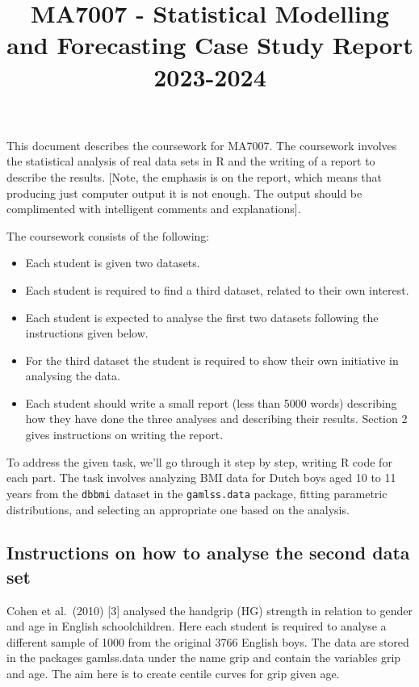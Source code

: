 \documentclass[
]{article}
\title{MA7007 - Statistical Modelling and Forecasting Case Study Report
2023-2024}
\author{}
\date{\vspace{-2.5em}}
\begin{document}
\maketitle

This document describes the coursework for MA7007. The coursework
involves the statistical analysis of real data sets in R and the writing
of a report to describe the results. {[}Note, the emphasis is on the
report, which means that producing just computer output it is not
enough. The output should be complimented with intelligent comments and
explanations{]}.

The coursework consists of the following:

\begin{itemize}
\item
  Each student is given two datasets.
\item
  Each student is required to find a third dataset, related to their own
  interest.
\item
  Each student is expected to analyse the first two datasets following
  the instructions given below.
\item
  For the third dataset the student is required to show their own
  initiative in analysing the data.
\item
  Each student should write a small report (less than 5000 words)
  describing how they have done the three analyses and describing their
  results. Section 2 gives instructions on writing the report.
\end{itemize}

To address the given task, we'll go through it step by step, writing R
code for each part. The task involves analyzing BMI data for Dutch boys
aged 10 to 11 years from the \texttt{dbbmi} dataset in the
\texttt{gamlss.data} package, fitting parametric distributions, and
selecting an appropriate one based on the analysis.

\hypertarget{instructions-on-how-to-analyse-the-second-data-set}{%
\subsection{Instructions on how to analyse the second data
set}\label{instructions-on-how-to-analyse-the-second-data-set}}

Cohen et al.~(2010) {[}3{]} analysed the handgrip (HG) strength in
relation to gender and age in English schoolchildren. Here each student
is required to analyse a different sample of 1000 from the original 3766
English boys. The data are stored in the packages gamlss.data under the
name grip and contain the variables grip and age. The aim here is to
create centile curves for grip given age.
\end{document}
